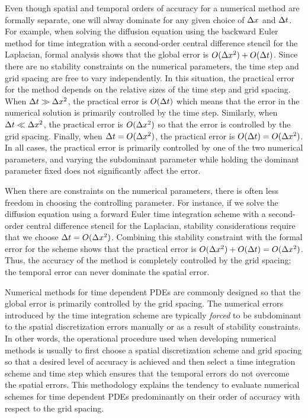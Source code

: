\documentclass[oneeqnum,onefignum,onetabnum,onethmnum]{siamltex}
\begin{document}
Even though spatial and temporal orders of accuracy for a numerical method
are formally separate, one will alway dominate for any given choice of 
$\Delta x$ and $\Delta t$.  For example, when solving the diffusion  equation 
using the backward Euler method for time integration with a second-order 
central difference stencil for the Laplacian, formal analysis shows that 
the global error is $O(\Delta x^2) + O(\Delta t)$.  Since there are no 
stability constraints on the numerical parameters, the time
step and grid spacing are free to vary independently.  In this situation, the 
practical error for the method depends on the relative sizes of the time step 
and grid spacing.  When $\Delta t \gg \Delta x^2$, the practical error is 
$O(\Delta t)$ which means that the error in the numerical solution is 
primarily controlled by the time step.  Similarly, when 
$\Delta t \ll \Delta x^2$, the practical error is $O(\Delta x^2)$ so that 
the error is controlled by the grid spacing.  Finally, when 
$\Delta t  = O(\Delta x^2)$, the practical error is 
$O(\Delta t) = O(\Delta x^2)$.  In all cases, the practical error is 
primarily controlled by one of the two numerical parameters, and varying
the subdominant parameter while holding the dominant parameter fixed does 
not significantly affect the error.
 
When there are constraints on the numerical parameters, there is often 
less freedom in choosing the controlling parameter.  For instance, if we 
solve the diffusion equation using a forward Euler time integration scheme 
with a second-order central difference stencil for the Laplacian, stability
considerations require that we choose $\Delta t = O(\Delta x^2)$.  
Combining this stability constraint with the formal error for the scheme
shows that the practical error is 
$O(\Delta x^2) + O(\Delta t) = O(\Delta x^2)$.  Thus, the accuracy of the 
method is completely controlled by the grid spacing; the temporal error can 
never dominate the spatial error.

Numerical methods for time dependent PDEs are commonly designed so that 
the global error is primarily controlled by the grid spacing.  The numerical
errors introduced by the time integration scheme are typically \emph{forced}
to be subdominant to the spatial discretization errors manually or as a result
of stability constraints.  In other words, the operational procedure used 
when developing numerical methods is usually to first choose a spatial 
discretization scheme and grid spacing so that a desired level of accuracy 
is achieved and then select a time integration scheme and time step which 
ensures that the temporal errors do not overcome the spatial errors.  
This methodology explains the tendency to evaluate numerical schemes for
time dependent PDEs predominantly on their order of accuracy with respect 
to the grid spacing.
\end{document}
